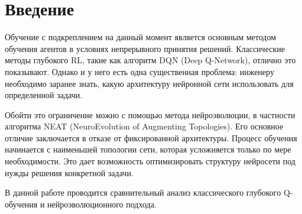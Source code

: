 \section{Введение}

Обучение с подкреплением на данный момент является основным методом обучения агентов в условиях непрерывного принятия решений. Классические методы глубокого RL, такие как алгоритм DQN (Deep Q-Network), отлично это показывают. Однако и у него есть одна существенная проблема: инженеру необходимо заранее знать, какую архитектуру нейронной сети использовать для определенной задачи.

Обойти это ограничение можно с помощью метода нейроэволюции, в частности алгоритма NEAT (NeuroEvolution of Augmenting Topologies). Его основное отличие заключается в отказе от фиксированной архитектуры. Процесс обучения начинается с наименьшей топологии сети, которая усложняется только по мере необходимости. Это дает возможность оптимизировать структуру нейросети под нужды решения конкретной задачи.

В данной работе проводится сравнительный анализ классического глубокого Q-обучения и нейроэволюционного подхода.